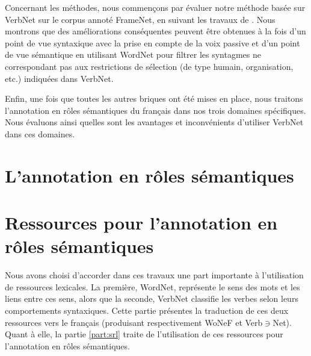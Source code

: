 \documentclass[oneside,parskip,draft]{scrbook}
\newcommand{\verbenet}{Verb$\ni$Net}
\begin{document}
Concernant les méthodes, nous commençons par évaluer notre méthode basée sur
VerbNet sur le corpus annoté FrameNet, en suivant les travaux de
\cite{swier2005exploiting}.  Nous montrons que des améliorations conséquentes
peuvent être obtenues à la fois d'un point de vue syntaxique avec la prise en
compte de la voix passive et d'un point de vue sémantique en utilisant WordNet
pour filtrer les syntagmes ne correspondant pas aux restrictions de sélection
(de type humain, organisation, etc.) indiquées dans VerbNet.

Enfin, une fois que toutes les autres briques ont été mises en place, nous
traitons l'annotation en rôles sémantiques du français dans nos trois domaines
spécifiques. Nous évaluons ainsi quelles sont les avantages et inconvénients
d'utiliser VerbNet dans ces domaines.


\setcounter{tocdepth}{3}
\tableofcontents

\mainmatter

\part{L'annotation en rôles sémantiques}





\part{Ressources pour l'annotation en rôles sémantiques}
\label{part:translation}


Nous avons choisi d'accorder dans ces travaux une part importante à
l'utilisation de ressources lexicales. La première, WordNet, représente le sens
des mots et les liens entre ces sens, alors que la seconde, VerbNet classifie
les verbes selon leurs comportements syntaxiques. Cette partie présentes la
traduction de ces deux ressources vers le français (produisant respectivement
WoNeF et \verbenet{}). Quant à elle, la partie \ref{part:srl} traite de
l'utilisation de ces ressources pour l'annotation en rôles sémantiques.




\end{document}
